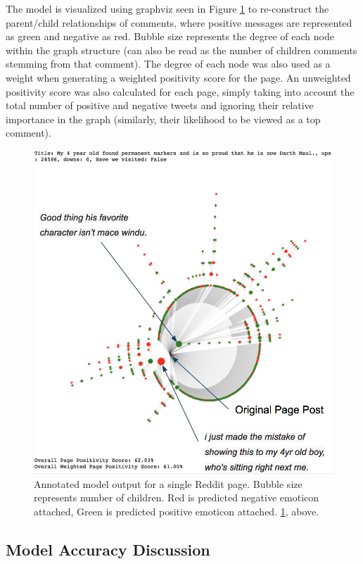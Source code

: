 \documentclass[11pt]{article}
\begin{document}
The model is visualized using graphviz seen in Figure \ref{fig:output} to re-construct 
the parent/child relationships of comments, 
where positive messages are represented as green and negative as red. Bubble 
size represents the degree of each node within the graph structure (can also be read 
as the number of children comments stemming from that comment). The degree of each 
node was also used as a weight when generating a weighted positivity score for the 
page. An unweighted positivity score was also calculated for each page, simply taking 
into account the total number of positive and negative tweets and ignoring their 
relative importance in the graph (similarly, their likelihood to be viewed as a top 
comment). 

\begin{figure}
  \includegraphics[width=\linewidth]{darth_maul_reddit.png}
  \caption{Annotated model output for a single Reddit page. 
  Bubble size represents number of children. Red is predicted 
  negative emoticon attached, Green is predicted positive emoticon attached. 
  \ref{fig:output}, above.}
  \label{fig:output}
\end{figure}

\subsection{Model Accuracy Discussion}
\end{document}
